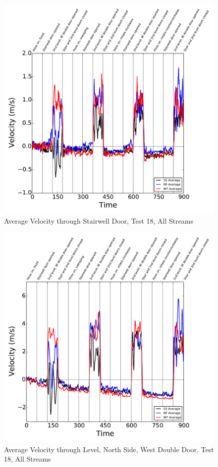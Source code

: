 \documentclass[12pt,oneside]{book}
\begin{document}
\begin{figure}[!ht]
\includegraphics[width=6in]{../../../Figures/Hose_Test_Figures/Test_18_West_063014_BDP_A10_Avg}
\caption{Average Velocity through Stairwell Door, Test 18, All Streams}
\label{fig:Test_18_BDP_A10_Avg_All}
\end{figure}

\begin{figure}[!ht]
\includegraphics[width=6in]{../../../Figures/Hose_Test_Figures/Test_18_West_063014_BDP_A13_Avg}
\caption{Average Velocity through  Level, North Side, West Double Door, Test 18, All Streams}
\label{fig:Test_18_BDP_A13_Avg_All}
\end{figure}
\end{document}
